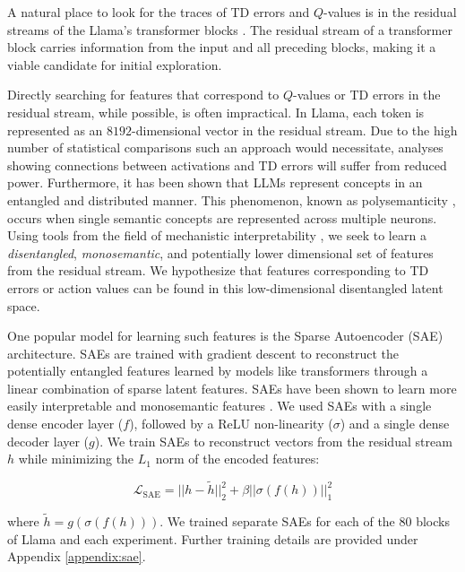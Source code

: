 \documentclass{article} %
\begin{document}
A natural place to look for the traces of TD errors and $Q$-values is in the residual streams of the Llama's transformer blocks \citep{templeton2024scaling, bricken_towards_2023, gurnee2023finding}. The residual stream of a transformer block carries information from the input and all preceding blocks, making it a viable candidate for initial exploration.

 Directly searching for features that correspond to $Q$-values or TD errors in the residual stream, while possible, is often impractical. In Llama, each token is represented as an $8192$-dimensional vector in the residual stream. Due to the high number of statistical comparisons such an approach would necessitate, analyses showing connections between activations and TD errors will suffer from reduced power. Furthermore, it has been shown that LLMs represent concepts in an entangled and distributed manner. This phenomenon, known as polysemanticity \citep{elhage2022superposition}, occurs when single semantic concepts are represented across multiple neurons. Using tools from the field of mechanistic interpretability \citep{olah_mechanistic_2023}, we seek to learn a \emph{disentangled}, \emph{monosemantic}, and potentially lower dimensional set of features from the residual stream. We hypothesize that features corresponding to TD errors or action values can be found in this low-dimensional disentangled latent space.

One popular model for learning such features is the Sparse Autoencoder (SAE) architecture. SAEs are trained with gradient descent to reconstruct the potentially entangled features learned by models like transformers through a linear combination of sparse latent features. SAEs have been shown to learn more easily interpretable and monosemantic features \citep{cunningham2023sparse, bricken_towards_2023}. We used SAEs with a single dense encoder layer ($f$), followed by a ReLU non-linearity ($\sigma$) and a single dense decoder layer ($g$). We train SAEs to reconstruct vectors from the residual stream $h$ while minimizing the $L_1$ norm of the encoded features:

\begin{equation}\label{eq:sae}
    \mathcal{L}_{\text{SAE}} = || h - \tilde{h}||_2^2 + \beta ||\sigma(f(h))||_1^2
\end{equation}

where $\tilde{h}= g(\sigma(f(h)))$. We trained separate SAEs for each of the $80$ blocks of Llama and each experiment. Further training details are provided under Appendix \ref{appendix:sae}.
\end{document}
